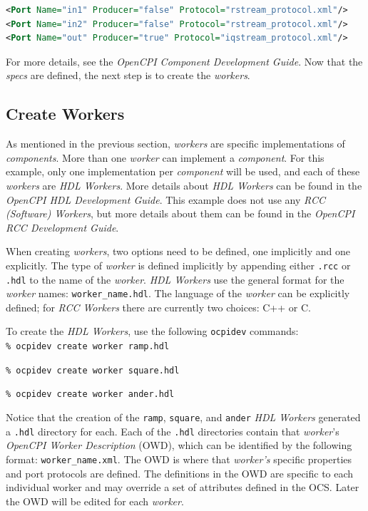 \begin{lstlisting}[language=xml]
<Port Name="in1" Producer="false" Protocol="rstream_protocol.xml"/>
<Port Name="in2" Producer="false" Protocol="rstream_protocol.xml"/>
<Port Name="out" Producer="true" Protocol="iqstream_protocol.xml"/>
\end{lstlisting}
\bend
For more details, see the \textit{OpenCPI Component Development Guide}. Now that the \textit{specs} are defined, the next step is to create the \textit{workers}.

\subsection{Create Workers}
As mentioned in the previous section, \textit{workers} are specific implementations of \textit{components}. More than one \textit{worker} can implement a \textit{component}. For this example, only one implementation per \textit{component} will be used, and each of these \textit{workers} are \textit{HDL Workers}. More details about \textit{HDL Workers} can be found in the \textit{OpenCPI HDL Development Guide}.
This example does not use any \textit{RCC (Software) Workers}, but more details about them can be found in the \textit{OpenCPI RCC Development Guide}.\newline

When creating \textit{workers}, two options need to be defined, one implicitly and one explicitly. The type of \textit{worker} is defined implicitly by appending either \verb+.rcc+ or \verb+.hdl+ to the name of the \textit{worker}. \textit{HDL Workers} use the general format for the \textit{worker} names: \verb+worker_name.hdl+. The language of the \textit{worker} can be explicitly defined; for \textit{RCC Workers} there are currently two choices: C++ or C.\newline

To create the \textit{HDL Workers}, use the following \verb+ocpidev+ commands:\\

\forceindent\verb+% ocpidev create worker ramp.hdl+

\forceindent\verb+% ocpidev create worker square.hdl+

\forceindent\verb+% ocpidev create worker ander.hdl+\\

\OcpidevCreate{}

Notice that the creation of the \verb+ramp+, \verb+square+, and \verb+ander+ \textit{HDL Workers} generated a \verb+.hdl+ directory for each. Each of the \verb+.hdl+ directories contain that \textit{worker}'s \textit{OpenCPI Worker Description} (OWD), which can be identified by the following format: \verb+worker_name.xml+. The OWD is where that \textit{worker's} specific properties and port protocols are defined. The definitions in the OWD are specific to each individual worker and may override a set of attributes defined in the OCS. Later the OWD will be edited for each \textit{worker}.\newline

